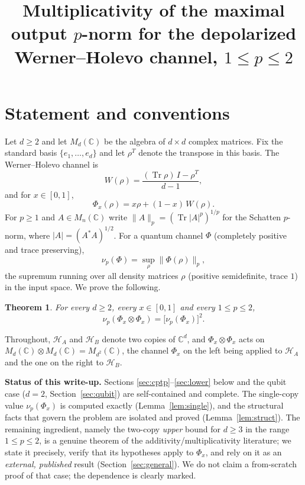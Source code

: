 \documentclass{amsart}
\newtheorem{theorem}{Theorem}
\theoremstyle{definition}
\DeclareMathOperator{\Tr}{Tr}
\newcommand{\HH}{\mathcal{H}}
\begin{document}
\title{Multiplicativity of the maximal output $p$-norm for the depolarized
Werner--Holevo channel, $1\le p\le 2$}
\maketitle

\section{Statement and conventions}

Let $d\ge 2$ and let $M_d(\mathbb{C})$ be the algebra of $d\times d$ complex
matrices. Fix the standard basis $\{e_1,\dots,e_d\}$ and let $\rho^{T}$ denote
the transpose in this basis. The Werner--Holevo channel is
\[
W(\rho)=\frac{(\Tr\rho)\,I-\rho^{T}}{d-1},
\]
and for $x\in[0,1]$,
\[
\Phi_x(\rho)=x\rho+(1-x)\,W(\rho).
\]
For $p\ge 1$ and $A\in M_n(\mathbb C)$ write $\|A\|_p=(\Tr|A|^p)^{1/p}$ for the
Schatten $p$-norm, where $|A|=(A^{*}A)^{1/2}$. For a quantum channel $\Phi$
(completely positive and trace preserving),
\[
\nu_p(\Phi)=\sup_{\rho}\|\Phi(\rho)\|_p ,
\]
the supremum running over all density matrices $\rho$ (positive semidefinite,
trace $1$) in the input space. We prove the following.

\begin{theorem}\label{thm:main}
For every $d\ge 2$, every $x\in[0,1]$ and every $1\le p\le 2$,
\[
\nu_p(\Phi_x\otimes\Phi_x)=\bigl[\nu_p(\Phi_x)\bigr]^{2}.
\]
\end{theorem}

Throughout, $\HH_A$ and $\HH_B$ denote two copies of $\mathbb C^{d}$, and
$\Phi_x\otimes\Phi_x$ acts on $M_d(\mathbb C)\otimes M_d(\mathbb C)=
M_{d^2}(\mathbb C)$, the channel $\Phi_x$ on the left being applied to
$\HH_A$ and the one on the right to $\HH_B$.

\medskip
\noindent\textbf{Status of this write-up.}
Sections \ref{sec:cptp}--\ref{sec:lower} below and the qubit case ($d=2$,
Section~\ref{sec:qubit}) are self-contained and complete. The single-copy value
$\nu_p(\Phi_x)$ is computed exactly (Lemma~\ref{lem:single}), and the structural
facts that govern the problem are isolated and proved (Lemma~\ref{lem:struct}).
The remaining ingredient, namely the two-copy \emph{upper} bound for $d\ge 3$ in
the range $1\le p\le 2$, is a genuine theorem of the additivity/multiplicativity
literature; we state it precisely, verify that its hypotheses apply to
$\Phi_x$, and rely on it as an \emph{external, published} result
(Section~\ref{sec:general}). We do not claim a from-scratch proof of that case;
the dependence is clearly marked.
\end{document}

